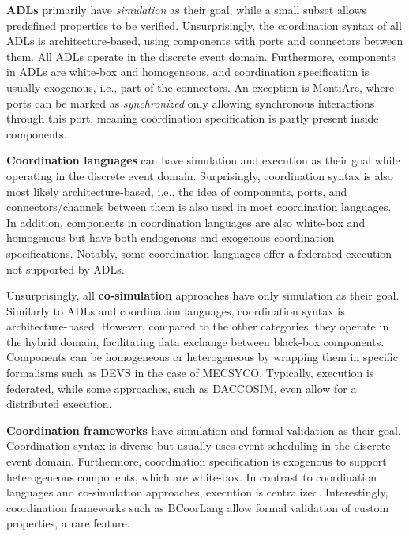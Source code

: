 \documentclass[runningheads]{llncs}
\begin{document}
\textbf{ADLs} primarily have \textit{simulation} as their goal, while a small subset allows predefined properties to be verified.
Unsurprisingly, the coordination syntax of all ADLs is architecture-based, using components with ports and connectors between them.
All ADLs operate in the discrete event domain.
Furthermore, components in ADLs are white-box and homogeneous, and coordination specification is usually exogenous, i.e., part of the connectors.
An exception is MontiArc, where ports can be marked as \textit{synchronized} only allowing synchronous interactions through this port, meaning coordination specification is partly present inside components.

\textbf{Coordination languages} can have simulation and execution as their goal while operating in the discrete event domain.
Surprisingly, coordination syntax is also most likely architecture-based, i.e., the idea of components, ports, and connectors/channels between them is also used in most coordination languages.
In addition, components in coordination languages are also white-box and homogenous but have both endogenous and exogenous coordination specifications.
Notably, some coordination languages offer a federated execution not supported by ADLs.

Unsurprisingly, all \textbf{co-simulation} approaches have only simulation as their goal.
Similarly to ADLs and coordination languages, coordination syntax is architecture-based.
However, compared to the other categories, they operate in the hybrid domain, facilitating data exchange between black-box components.
Components can be homogeneous or heterogeneous by wrapping them in specific formalisms such as DEVS in the case of MECSYCO.
Typically, execution is federated, while some approaches, such as DACCOSIM, even allow for a distributed execution.

\textbf{Coordination frameworks} have simulation and formal validation as their goal.
Coordination syntax is diverse but usually uses event scheduling in the discrete event domain.
Furthermore, coordination specification is exogenous to support heterogeneous components, which are white-box.
In contrast to coordination languages and co-simulation approaches, execution is centralized.
Interestingly, coordination frameworks such as BCoorLang allow formal validation of custom properties, a rare feature.
\end{document}
